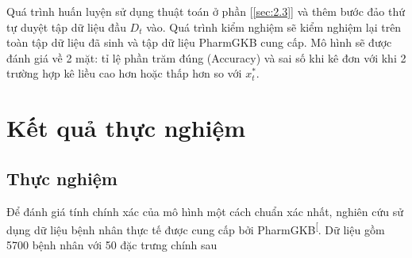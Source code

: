 \documentclass[14pt,oneside]{scrbook}
\begin{document}
Quá trình huấn luyện sử dụng thuật toán ở phần {[}\ref{sec:2.3}{]} và
thêm bước đảo thứ tự duyệt tập dữ liệu đầu \(D_t\) vào. Quá trình kiểm
nghiệm sẽ kiểm nghiệm lại trên toàn tập dữ liệu đã sinh và tập dữ liệu
PharmGKB cung cấp. Mô hình sẽ được đánh giá về 2 mặt: tỉ lệ phần trăm
đúng (Accuracy) và sai số khi kê đơn với khi 2 trường hợp kê liều cao
hơn hoặc thấp hơn so với \(x^*_t\).

\chapter{Kết quả thực nghiệm}\label{sec:3}

\section{Thực nghiệm}\label{thux1ef1c-nghiux1ec7m}

Để đánh giá tính chính xác của mô hình một cách chuẩn xác nhất, nghiên
cứu sử dụng dữ liệu bệnh nhân thực tế được cung cấp bởi
PharmGKB\textsuperscript{{[}\citeproc{ref-warfarin-data}{6}{]}}. Dữ liệu
gồm 5700 bệnh nhân với 50 đặc trưng chính sau
\end{document}
